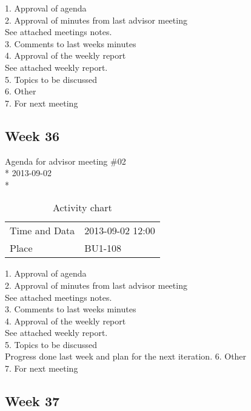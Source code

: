 1. Approval of agenda \\
2. Approval of minutes from last advisor meeting \\
See attached meetings notes. \\
3. Comments to last weeks minutes \\
4. Approval of the weekly report \\
See attached weekly report. \\
5. Topics to be discussed \\
6. Other \\
7. For next meeting \\

\newpage
\subsection{Week 36}

\begin{center}
Agenda for advisor meeting \#02\\*
2013-09-02\\*
\end{center}

\begin{table}[H]
\begin{center}
\begin{tabular}{ l | l }
Time and Data & 2013-09-02 12:00 \\
Place & BU1-108 \\
\end{tabular}
\end{center}
\caption{Activity chart}
\label{table:activityChartAdvisorAgendaWeek36}
\end{table}


1. Approval of agenda \\
2. Approval of minutes from last advisor meeting \\
See attached meetings notes. \\
3. Comments to last weeks minutes \\
4. Approval of the weekly report \\
See attached weekly report. \\
5. Topics to be discussed \\
Progress done last week and plan for the next iteration.
6. Other \\
7. For next meeting \\

\iffalse
\newpage
\subsection{Week 37}

